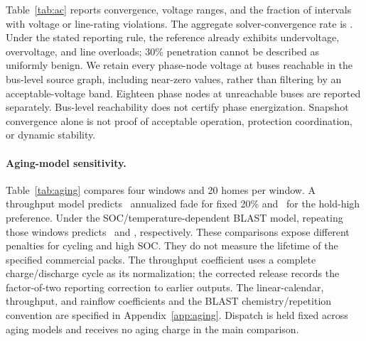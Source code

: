 Table~\ref{tab:ac} reports convergence, voltage ranges, and the fraction of intervals with voltage or line-rating violations. The aggregate solver-convergence rate is \ACConvergence. Under the stated reporting rule, the reference already exhibits undervoltage, overvoltage, and line overloads; 30\% penetration cannot be described as uniformly benign. We retain every phase-node voltage at buses reachable in the bus-level source graph, including near-zero values, rather than filtering by an acceptable-voltage band. Eighteen phase nodes at unreachable buses are reported separately. Bus-level reachability does not certify phase energization. Snapshot convergence alone is not proof of acceptable operation, protection coordination, or dynamic stability.

\paragraph{Aging-model sensitivity.}
Table~\ref{tab:aging} compares four windows and 20 homes per window. A throughput model predicts \FixedETFade\ annualized fade for fixed 20\% and \HoldETFade\ for the hold-high preference. Under the SOC/temperature-dependent BLAST model, repeating those windows predicts \FixedBLASTFade\ and \HoldBLASTFade, respectively. These comparisons expose different penalties for cycling and high SOC. They do not measure the lifetime of the specified commercial packs. The throughput coefficient uses a complete charge/discharge cycle as its normalization; the corrected release records the factor-of-two reporting correction to earlier outputs. The linear-calendar, throughput, and rainflow coefficients and the BLAST chemistry/repetition convention are specified in Appendix~\ref{app:aging}. Dispatch is held fixed across aging models and receives no aging charge in the main comparison.
